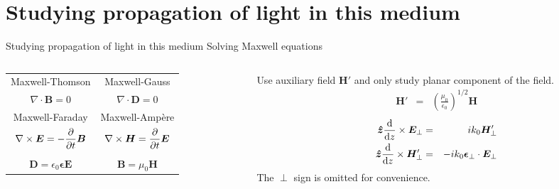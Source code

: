\documentclass[aspectratio=169]{beamer}
\begin{document}
\section{Studying propagation of light in this medium}

\begin{frame}{Studying propagation of light in this medium}
{\huge Solving Maxwell equations}
\begin{columns}
	\begin{column}{0.5\textwidth}
		\begin{tabulary}{\linewidth}{CC}
			Maxwell-Thomson & Maxwell-Gauss\\
			\(\displaystyle\nabla\cdot\bm{B} = 0\) & \(\displaystyle\nabla\cdot\bm{D}=0\)\\
			Maxwell-Faraday & Maxwell-Ampère\\
			\(\displaystyle\nabla\times\bm{E}=-\pdv{t}\bm{B}\) & \(\displaystyle\nabla\times\bm{H}=\pdv{t}\bm{E}\)\\
			&\\
			\(\displaystyle\bm{D} = \epsilon_0\bm{\epsilon}\bm{E}\) & \(\displaystyle\bm{B} = \mu_0\bm{H}\)
		\end{tabulary}
	\end{column}
	\begin{column}{0.5\textwidth}
		Use auxiliary field $\bm{H}'$ and only study planar component of the field.
		\begin{eqnarray*}
		\bm{H}' &=& \left(\frac{\mu_0}{\epsilon_0}\right)^{1/2}\bm{H}
		\end{eqnarray*}
		\begin{eqnarray*}
		\bm{\hat{z}}\dv{z}\times\bm{E}_\perp &=& ik_0\bm{H}'_\perp\\
		\bm{\hat{z}}\dv{z}\times\bm{H}'_\perp &=& -ik_0\bm{\epsilon}_\perp\cdot\bm{E}_\perp
		\end{eqnarray*}
		\alert{The $\perp$ sign is omitted for convenience.}
	\end{column}
\end{columns}
\end{frame}
\end{document}
